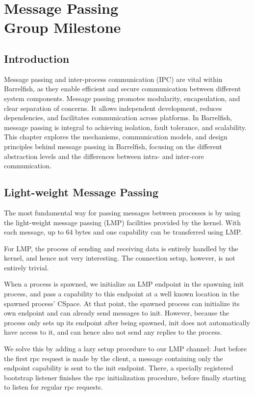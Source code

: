 \chapter[Message Passing]{Message Passing \\ \Large \textnormal{Group Milestone}}

\section{Introduction}

\label{chapter:mp}
Message passing and inter-process communication (IPC) are vital within Barrelfish, as they enable efficient and secure communication between different system components. Message passing promotes modularity, encapsulation, and clear separation of concerns. It allows independent development, reduces dependencies, and facilitates communication across platforms. In Barrelfish, message passing is integral to achieving isolation, fault tolerance, and scalability. This chapter explores the mechanisms, communication models, and design principles behind message passing in Barrelfish, focusing on the different abstraction levels and the differences between intra- and inter-core communication.

\section{Light-weight Message Passing}
The most fundamental way for passing messages between processes is by using the light-weight message passing (LMP) facilities provided by the kernel. With each message, up to 64 bytes and one capability can be transferred using LMP.

For LMP, the process of sending and receiving data is entirely handled by the kernel, and hence not very interesting. The connection setup, however, is not entirely trivial.

When a process is spawned, we initialize an LMP endpoint in the spawning init process, and pass a capability to this endpoint at a well known location in the spawned process' CSpace. At that point, the spawned process can initialize its own endpoint and can already send messages to init. However, because the process only sets up its endpoint after being spawned, init does not automatically have access to it, and can hence also not send any replies to the process.

We solve this by adding a lazy setup procedure to our LMP channel: Just before the first rpc request is made by the client, a message containing only the endpoint capability is sent to the init endpoint. There, a specially registered bootstrap listener finishes the rpc initialization procedure, before finally starting to listen for regular rpc requests.


